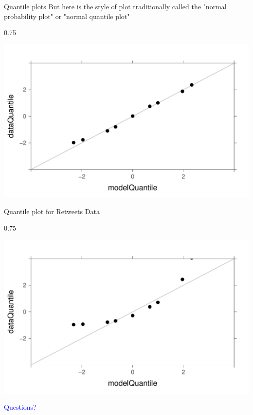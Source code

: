 \documentclass{beamer}\usepackage[]{graphicx}\usepackage[]{color}
\newenvironment{knitrout}{}{} %
\renewenvironment{knitrout}{\begin{spacing}{0.75}\begin{tiny}}{\end{tiny}\end{spacing}}
\begin{document}
\begin{frame}{Quantile plots}
 But here is the style of plot traditionally called the "normal probability plot" or "normal quantile plot"
\begin{knitrout}\small
{}\color{fgcolor}

{\centering \includegraphics[width=0.89\linewidth]{figure/graphics-unnamed-chunk-25-1} 

}



\end{knitrout}

\end{frame}


\begin{frame}{Quantile plot for Retweets Data}

\begin{knitrout}\small
{}\color{fgcolor}

{\centering \includegraphics[width=0.89\linewidth]{figure/graphics-unnamed-chunk-26-1} 

}



\end{knitrout}
\end{frame}

\begin{frame}

\centering \large{\textcolor{blue}{Questions?}}

\end{frame}

\end{document}

